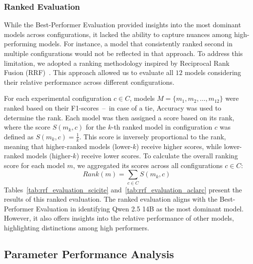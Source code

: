 \subsubsection{Ranked Evaluation}\label{sec:ranked_evaluation}

While the Best-Performer Evaluation provided insights into the most dominant models across configurations, it lacked the ability to capture nuances among high-performing models. For instance, a model that consistently ranked second in multiple configurations would not be reflected in that approach.
To address this limitation, we adopted a ranking methodology inspired by Reciprocal Rank Fusion (RRF)~\citep{cormack2009reciprocal}. 
This approach allowed us to evaluate all $12$ models considering their relative performance across different configurations.

For each experimental configuration \(c \in C\),  models \(M =\{ m_1, m_2, \dots, m_{12} \}\) were ranked based on their F1-scores~--~in case of a tie, Accuracy was used to determine the rank.
Each model was then assigned a score based on its rank, where the score \(S(m_{k}, c)\) for the \(k\)-th ranked model in configuration \(c\) was defined as \(S(m_{k}, c) = \frac{1}{k}\). 
This score is inversely proportional to the rank, meaning that higher-ranked models (lower-\(k\)) receive higher scores, while lower-ranked models (higher-\(k\)) receive lower scores. 
To calculate the overall ranking score for each model \(m\), we aggregated its scores across all configurations \(c \in C\):
\begin{equation}
    Rank(m) = \sum_{c \in C} S(m_{k}, c)
\end{equation}
Tables~\ref{tab:rrf_evaluation_scicite} and~\ref{tab:rrf_evaluation_aclarc} present the results of this ranked evaluation. The ranked evaluation aligns with the Best-Performer Evaluation in identifying Qwen 2.5 14B as the most dominant model. However, it also offers insights into the relative performance of other models, 
highlighting distinctions among high performers. 

\subsection{Parameter Performance Analysis}\label{sec:parameter_performance}



